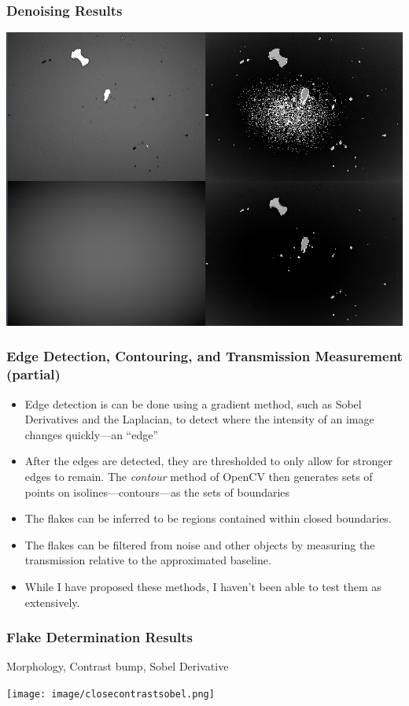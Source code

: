 \documentclass{beamer}
\begin{document}
\begin{frame}
	\frametitle{Denoising Results}
	\begin{center}
		\includegraphics[scale = 0.3]{image/morph2.png}
	\end{center}
\end{frame}

\begin{frame}
	\frametitle{Edge Detection, Contouring, and Transmission Measurement (partial)}
	\begin{itemize}
		\item<1-> Edge detection is can be done using a gradient method, such as Sobel Derivatives and the Laplacian, to detect where the intensity of an image changes quickly---an ``edge''
		\item<2-> After the edges are detected, they are thresholded to only allow for stronger edges to remain. The \emph{contour} method of OpenCV then generates sets of points on isolines---contours---as the sets of boundaries
		\item<3-> The flakes can be inferred to be regions contained within closed boundaries.
		\item<4-> The flakes can be filtered from noise and other objects by measuring the transmission relative to the approximated baseline.
		\item<5-> While I have proposed these methods, I haven't been able to test them as extensively.
	\end{itemize}
\end{frame}

\begin{frame}
	\frametitle{Flake Determination Results}
	Morphology, Contrast bump, Sobel Derivative
	\begin{center}
		\texttt{[image: image/closecontrastsobel.png]}
	\end{center}
\end{frame}
\end{document}
